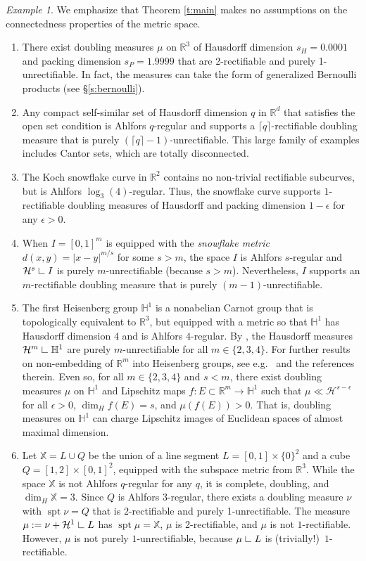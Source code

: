 \documentclass[12pt]{amsart}
\theoremstyle{definition}
\theoremstyle{remark}
\newtheorem{example}[theorem]{Example}
\newcommand{\RR}{\mathbb{R}}
\newcommand{\XX}{\mathbb{X}}
\newcommand{\HH}{\mathbb{H}}
\newcommand{\Haus}{\mathcal{H}}
\newcommand{\spt}{\mathop\mathrm{spt}\nolimits}
\newcommand{\res}{\hbox{ {\vrule height .22cm}{\leaders\hrule\hskip.2cm} }} %
\numberwithin{figure}{section}
\numberwithin{equation}{section}
\begin{document}
\begin{example}\label{big-list-of-examples} We emphasize that Theorem \ref{t:main}
makes no assumptions on the connectedness properties of the metric space. \begin{enumerate}
\item There exist doubling measures $\mu$ on $\RR^3$ of Hausdorff dimension $s_H=0.0001$ and packing dimension $s_P=1.9999$ that are 2-rectifiable and purely 1-unrectifiable. In fact, the measures can take the form of generalized Bernoulli products (see \S\ref{s:bernoulli}).
\item Any compact self-similar set of Hausdorff dimension $q$ in $\RR^d$ that satisfies the open set condition is Ahlfors $q$-regular and supports a $\lceil q\rceil$-rectifiable doubling measure that is purely $(\lceil q\rceil-1)$-unrectifiable. This large family of examples includes Cantor sets, which are totally disconnected.
\item The Koch snowflake curve in $\RR^2$ contains no non-trivial rectifiable subcurves, but is Ahlfors $\log_3(4)$-regular. Thus, the snowflake curve supports $1$-rectifiable doubling measures of Hausdorff and packing dimension $1-\epsilon$ for any $\epsilon>0$.
\item When $I=[0,1]^m$ is equipped with the \emph{snowflake metric} $d(x,y)=|x-y|^{m/s}$ for some $s>m$, the space $I$ is Ahlfors $s$-regular and $\Haus^s\res I$ is purely $m$-unrectifiable (because $s>m$). Nevertheless, $I$ supports an $m$-rectifiable doubling measure that is purely $(m-1)$-unrectifiable.
\item The first Heisenberg group $\mathbb{H}^1$ is a nonabelian Carnot group that is topologically equivalent to $\RR^3$, but equipped with a metric so that $\mathbb{H}^1$ has Hausdorff dimension $4$ and is Ahlfors $4$-regular. By \cite[Theorem 7.2]{AK}, the Hausdorff measures $\Haus^m\res\HH^1$ are purely $m$-unrectifiable for all $m\in\{2,3,4\}$. For further results on non-embedding of $\RR^m$ into Heisenberg groups, see e.g.~\cite{HS-Gromov-nonembedding} and the references therein. Even so, for all $m\in\{2,3,4\}$ and $s<m$, there exist doubling measures $\mu$ on $\mathbb{H}^1$ and Lipschitz maps $f:E\subset\RR^m\rightarrow\HH^1$ such that $\mu\ll\Haus^{s-\epsilon}$ for all $\epsilon>0$, $\dim_H f(E)=s$, and $\mu(f(E))>0$. That is, doubling measures on $\HH^1$ can charge Lipschitz images of Euclidean spaces of almost maximal dimension.
\item Let $\XX=L\cup Q$ be the union of a line segment $L=[0,1]\times\{0\}^2$ and a cube $Q=[1,2]\times[0,1]^2$, equipped with the subspace metric from $\RR^3$. While the space $\XX$ is not Ahlfors $q$-regular for any $q$, it is complete, doubling, and $\dim_H\XX=3$. Since $Q$ is Ahlfors $3$-regular, there exists a doubling measure $\nu$ with $\spt\nu= Q$ that is $2$-rectifiable and purely 1-unrectifiable. The measure $\mu:=\nu+\Haus^1\res L$ has $\spt\mu=\XX$, $\mu$ is 2-rectifiable, and $\mu$ is not $1$-rectifiable. However, $\mu$ is not purely $1$-unrectifiable, because $\mu\res L$ is (trivially!)~$1$-rectifiable.
\end{enumerate}\end{example}
\end{document}
